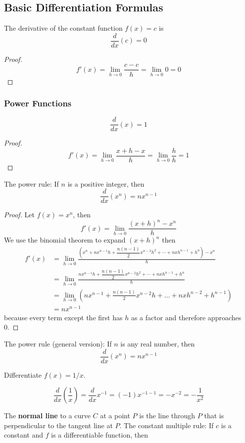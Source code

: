 \subsection{Basic Differentiation Formulas}


The derivative of the constant function \(f(x)=c\) is
\[\frac{d}{dx}(c)=0\]
\begin{proof}
    \[f'(x)=\lim_{h\to 0}\frac{c-c}{h}=\lim_{h\to 0}0=0\]
\end{proof}

\subsubsection*{Power Functions}
\[\frac{d}{dx}(x)=1\]
\begin{proof}
    \[f'(x)=\lim_{h\to 0}\frac{x+h-x}{h}=\lim_{h\to 0}\frac{h}{h}=1\]
\end{proof}
The power rule:
If \(n\) is a positive integer, then
\[\frac{d}{dx}(x^n)=nx^{n-1}\]
\begin{proof}
    Let \(f(x)=x^n\), then
    \[f'(x)=\lim_{h\to 0}\frac{(x+h)^n-x^n}{h}\]
    We use the binomial theorem to expand \((x+h)^n\) then
    \begin{align*}
        f'(x)
        &= \lim_{h\to 0}
        \frac{
            \left(x^n+nx^{n-1}h+\dfrac{n(n-1)}{2}x^{n-2}h^2+\cdots+nxh^{n-1}
            +h^n\right)-x^n}{h} \\
        &= \lim_{h\to 0}
        \frac{
            nx^{n-1}h+\dfrac{n(n-1)}{2}x^{n-2}h^2+\cdots+nxh^{n-1}+h^n}{h} \\
        &= \lim_{h\to 0}
        (nx^{n-1}+\frac{n(n-1)}{2}x^{n-2}h+\dots+nxh^{n-2}+h^{n-1}) \\
        &= nx^{n-1}
    \end{align*}
    because every term except the first has \(h\) as a factor and therefore
    approaches 0.
\end{proof}
The power rule (general version):
If \(n\) is any real number, then
\[\frac{d}{dx}(x^n)=nx^{n-1}\]
\begin{problem}
    Differentiate \(f(x)=1/x\).
\end{problem}
\begin{solution}
    \[\frac{d}{dx}\left(\frac{1}{x}\right)=\frac{d}{dx}x^{-1}=(-1)x^{-1-1}
    =-x^{-2}=-\frac{1}{x^2}\]
\end{solution}
The \textbf{normal line} to a curve \(C\) at a point \(P\) is the line through
\(P\) that is perpendicular to the tangent line at \(P\).
The constant multiple rule:
If \(c\) is a constant and \(f\) is a differentiable function, then
